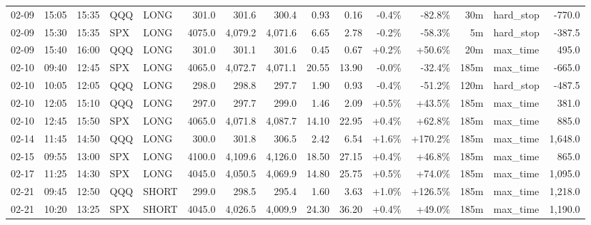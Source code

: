 \documentclass[11pt,a4paper,twoside]{article}
\begin{document}
\begin{landscape}
\begin{center}
\begin{longtable}{>{\color{txtmain}}l l l l l r r r r r r r r >{\color{txtmain}}l r}
02-09 & 15:05 & 15:35 & QQQ & LONG & 301.0 & 301.6 & 300.4 & 0.93 & 0.16 & \textcolor{lossred}{-0.4\%} & \textcolor{lossred}{-82.8\%} & 30m & hard\_stop & \textcolor{lossred}{-770.0} \\
02-09 & 15:30 & 15:35 & SPX & LONG & 4075.0 & 4,079.2 & 4,071.6 & 6.65 & 2.78 & \textcolor{lossred}{-0.2\%} & \textcolor{lossred}{-58.3\%} & 5m & hard\_stop & \textcolor{lossred}{-387.5} \\
02-09 & 15:40 & 16:00 & QQQ & LONG & 301.0 & 301.1 & 301.6 & 0.45 & 0.67 & \textcolor{wingreen}{+0.2\%} & \textcolor{wingreen}{+50.6\%} & 20m & max\_time & \textcolor{wingreen}{495.0} \\
02-10 & 09:40 & 12:45 & SPX & LONG & 4065.0 & 4,072.7 & 4,071.1 & 20.55 & 13.90 & \textcolor{lossred}{-0.0\%} & \textcolor{lossred}{-32.4\%} & 185m & max\_time & \textcolor{lossred}{-665.0} \\
02-10 & 10:05 & 12:05 & QQQ & LONG & 298.0 & 298.8 & 297.7 & 1.90 & 0.93 & \textcolor{lossred}{-0.4\%} & \textcolor{lossred}{-51.2\%} & 120m & hard\_stop & \textcolor{lossred}{-487.5} \\
02-10 & 12:05 & 15:10 & QQQ & LONG & 297.0 & 297.7 & 299.0 & 1.46 & 2.09 & \textcolor{wingreen}{+0.5\%} & \textcolor{wingreen}{+43.5\%} & 185m & max\_time & \textcolor{wingreen}{381.0} \\
02-10 & 12:45 & 15:50 & SPX & LONG & 4065.0 & 4,071.8 & 4,087.7 & 14.10 & 22.95 & \textcolor{wingreen}{+0.4\%} & \textcolor{wingreen}{+62.8\%} & 185m & max\_time & \textcolor{wingreen}{885.0} \\
02-14 & 11:45 & 14:50 & QQQ & LONG & 300.0 & 301.8 & 306.5 & 2.42 & 6.54 & \textcolor{wingreen}{+1.6\%} & \textcolor{wingreen}{+170.2\%} & 185m & max\_time & \textcolor{wingreen}{1,648.0} \\
02-15 & 09:55 & 13:00 & SPX & LONG & 4100.0 & 4,109.6 & 4,126.0 & 18.50 & 27.15 & \textcolor{wingreen}{+0.4\%} & \textcolor{wingreen}{+46.8\%} & 185m & max\_time & \textcolor{wingreen}{865.0} \\
02-17 & 11:25 & 14:30 & SPX & LONG & 4045.0 & 4,050.5 & 4,069.9 & 14.80 & 25.75 & \textcolor{wingreen}{+0.5\%} & \textcolor{wingreen}{+74.0\%} & 185m & max\_time & \textcolor{wingreen}{1,095.0} \\
02-21 & 09:45 & 12:50 & QQQ & SHORT & 299.0 & 298.5 & 295.4 & 1.60 & 3.63 & \textcolor{wingreen}{+1.0\%} & \textcolor{wingreen}{+126.5\%} & 185m & max\_time & \textcolor{wingreen}{1,218.0} \\
02-21 & 10:20 & 13:25 & SPX & SHORT & 4045.0 & 4,026.5 & 4,009.9 & 24.30 & 36.20 & \textcolor{wingreen}{+0.4\%} & \textcolor{wingreen}{+49.0\%} & 185m & max\_time & \textcolor{wingreen}{1,190.0} \\

\end{longtable}
\end{center}
\end{landscape}
\end{document}
